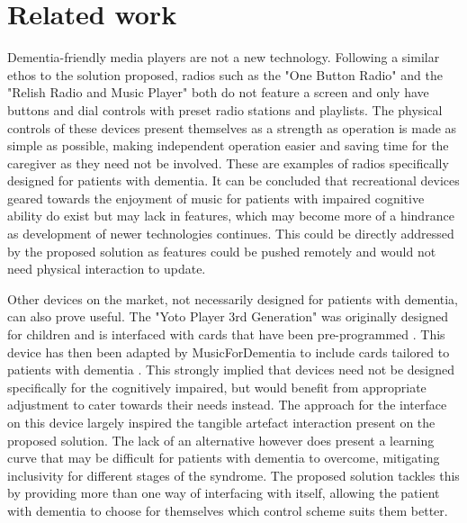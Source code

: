 \section{Related work}\label{sec:related}
Dementia-friendly media players are not a new technology. Following a similar ethos to the solution proposed, radios such as the "One Button Radio" and the "Relish Radio and Music Player" \citep{Danny2021} both do not feature a screen and only have buttons and dial controls with preset radio stations and playlists. The physical controls of these devices present themselves as a strength as operation is made as simple as possible, making independent operation easier and saving time for the caregiver as they need not be involved. These are examples of radios specifically designed for patients with dementia. It can be concluded that recreational devices geared towards the enjoyment of music for patients with impaired cognitive ability do exist but may lack in features, which may become more of a hindrance as development of newer technologies continues. This could be directly addressed by the proposed solution as features could be pushed remotely and would not need physical interaction to update.

Other devices on the market, not necessarily designed for patients with dementia, can also prove useful. The "Yoto Player 3rd Generation" was originally designed for children and is interfaced with cards that have been pre-programmed \citep{Yoto2023}. This device has then been adapted by MusicForDementia to include cards tailored to patients with dementia \citep{Utley2026}. This strongly implied that devices need not be designed specifically for the cognitively impaired, but would benefit from appropriate adjustment to cater towards their needs instead. The approach for the interface on this device largely inspired the tangible artefact interaction present on the proposed solution. The lack of an alternative however does present a learning curve that may be difficult for patients with dementia to overcome, mitigating inclusivity for different stages of the syndrome. The proposed solution tackles this by providing more than one way of interfacing with itself, allowing the patient with dementia to choose for themselves which control scheme suits them better.

